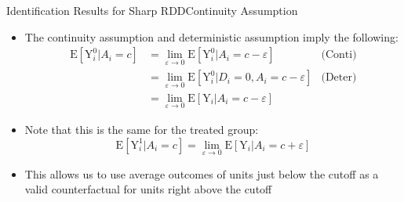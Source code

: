 \documentclass[hyperref={pdfpagelabels=false}]{beamer}
\begin{document}
\begin{frame}{Identification Results for Sharp RDD}{Continuity Assumption}
	\begin{itemize}
		\item The continuity assumption and deterministic assumption imply the following:
		\begin{equation*}
		\begin{aligned}
		\mathrm{E}[\mathrm{Y}^{0}_{i}|A_i=c] &= \lim_{\varepsilon\rightarrow 0}\mathrm{E}[\mathrm{Y}^{0}_{i}|A_i=c-\varepsilon] &\text{(Conti})\\
		&= 	
		\lim_{\varepsilon\rightarrow 0}\mathrm{E}[\mathrm{Y}^{0}_{i}|D_i=0, A_i=c-\varepsilon] &\text{(Deter)} \\
		&= \lim_{\varepsilon\rightarrow 0}\mathrm{E}[\mathrm{Y}_{i}|A_i=c-\varepsilon] 
		\end{aligned}
		\end{equation*}
		\item Note that this is the same for the treated group:
		\begin{equation*}
		\mathrm{E}[\mathrm{Y}^{1}_{i}|A_i=c] = \lim_{\varepsilon\rightarrow 0}\mathrm{E}[\mathrm{Y}_{i}|A_i=c+\varepsilon]
		\end{equation*}
		\item This allows us to use average outcomes of units just below the cutoff as a valid counterfactual for units right above the cutoff 
		
	\end{itemize}
\end{frame}
\end{document}
